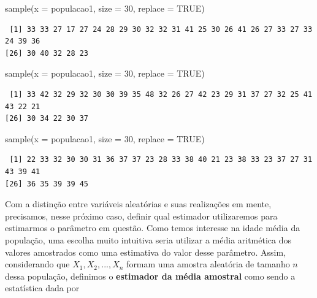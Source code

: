 \documentclass[
  letterpaper,
  DIV=11,
  numbers=noendperiod]{scrreprt}
\newenvironment{Shaded}{\begin{snugshade}}{\end{snugshade}}
\newcommand{\AttributeTok}[1]{\textcolor[rgb]{0.40,0.45,0.13}{#1}}
\newcommand{\ConstantTok}[1]{\textcolor[rgb]{0.56,0.35,0.01}{#1}}
\newcommand{\DecValTok}[1]{\textcolor[rgb]{0.68,0.00,0.00}{#1}}
\newcommand{\FunctionTok}[1]{\textcolor[rgb]{0.28,0.35,0.67}{#1}}
\newcommand{\NormalTok}[1]{\textcolor[rgb]{0.00,0.23,0.31}{#1}}
\begin{document}
\begin{Shaded}
\begin{Highlighting}[]
\FunctionTok{sample}\NormalTok{(}\AttributeTok{x =}\NormalTok{ populacao1, }\AttributeTok{size =} \DecValTok{30}\NormalTok{, }\AttributeTok{replace =} \ConstantTok{TRUE}\NormalTok{)}
\end{Highlighting}
\end{Shaded}

\begin{verbatim}
 [1] 33 33 27 17 27 24 28 29 30 32 32 31 41 25 30 26 41 26 27 33 27 33 24 39 36
[26] 30 40 32 28 23
\end{verbatim}

\begin{Shaded}
\begin{Highlighting}[]
\FunctionTok{sample}\NormalTok{(}\AttributeTok{x =}\NormalTok{ populacao1, }\AttributeTok{size =} \DecValTok{30}\NormalTok{, }\AttributeTok{replace =} \ConstantTok{TRUE}\NormalTok{)}
\end{Highlighting}
\end{Shaded}

\begin{verbatim}
 [1] 33 42 32 29 32 30 30 39 35 48 32 26 27 42 23 29 31 37 27 32 25 41 43 22 21
[26] 30 34 22 30 37
\end{verbatim}

\begin{Shaded}
\begin{Highlighting}[]
\FunctionTok{sample}\NormalTok{(}\AttributeTok{x =}\NormalTok{ populacao1, }\AttributeTok{size =} \DecValTok{30}\NormalTok{, }\AttributeTok{replace =} \ConstantTok{TRUE}\NormalTok{)}
\end{Highlighting}
\end{Shaded}

\begin{verbatim}
 [1] 22 33 32 30 30 31 36 37 37 23 28 33 38 40 21 23 38 33 23 37 27 31 43 39 41
[26] 36 35 39 39 45
\end{verbatim}

Com a distinção entre variáveis aleatórias e suas realizações em mente,
precisamos, nesse próximo caso, definir qual estimador utilizaremos para
estimarmos o parâmetro em questão. Como temos interesse na idade média
da população, uma escolha muito intuitiva seria utilizar a média
aritmética dos valores amostrados como uma estimativa do valor desse
parâmetro. Assim, considerando que \(X_1, X_2, ..., X_n\) formam uma
amostra aleatória de tamanho \(n\) dessa população, definimos o
\textbf{estimador da média amostral} como sendo a estatística dada por
\end{document}
